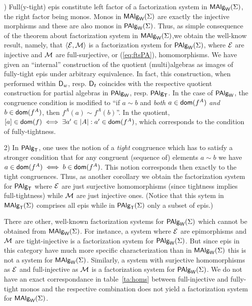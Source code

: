\documentclass[10pt]{article}
\begin{document}

) Full(y-tight) epis constitute left factor of a factorization system
in $\mbox{\rm\sf MAlg}_{\sf W}(\Sigma)$, the right factor being monos. Monos in $\mbox{\rm\sf MAlg}_{\sf W}(\Sigma)$ are exactly
the injective morphisms and these are also monos in $\mbox{\rm\sf PAlg}_{\sf W}(\Sigma)$. Thus, as
simple consequence of the theorem about factorization system in
$\mbox{\rm\sf MAlg}_{\sf W}(\Sigma)$,we obtain the well-know result, namely, that $\langle{\cal E},{\cal M}\rangle$
is a factorization system for $\mbox{\rm\sf PAlg}_{\sf W}(\Sigma)$, where ${\cal E}$ are injective and
${\cal M}$ are full-surjective, or (\ref{eq:ftsPA}), homomorphisms.  We
have given an ``internal'' construction of the quotient
(multi)algebras as images of fully-tight epis under arbitrary
equivalence. In fact, this construction, when performed within
$\mbox{\rm\sf D}_w$, resp.  $\mbox{\rm\sf D}_t$ coincides with the respective quotient
construction for partial algebras in $\mbox{\rm\sf PAlg}_{\sf W}$, resp. $\mbox{\rm\sf PAlg}_{\sf T}$.  In the
case of $\mbox{\rm\sf PAlg}_{\sf W}$, the congruence condition is modified to ``if $a \sim
b$ and {\em both} $a\in\mbox{\sf dom}(f^A)$ {\em and} $b\in\mbox{\sf dom}(f^A)$,
then $f^A(a)\sim f^A(b)$''. In the quotient, $[a]\in\mbox{\sf dom}(f) \iff
\exists a'\in|A|:a'\in\mbox{\sf dom}(f^A)$, which corresponds to the
condition of fully-tightness. 

\medskip

2) In $\mbox{\rm\sf PAlg}_{\sf T}$, one uses the notion of a {\em tight} congruence which
has to satisfy a stronger condition that for any congruent (sequence
of) elements $a\sim b$ we have $a\in \mbox{\sf dom}(f^A)\iff
b\in\mbox{\sf dom}(f^A)$. This notion corresponds then exactly to the tight
congruences.  Thus, as another corollary we obtain the factorization
system for $\mbox{\rm\sf PAlg}_{\sf T}$ where ${\cal E}$ are just surjective homomorphisms
(since tightness implies full-tightness) while ${\cal M}$ are just
injective ones. (Notice that this sytem in $\mbox{\rm\sf MAlg}_{\sf T}(\Sigma)$ comprises all epis
while in $\mbox{\rm\sf PAlg}_{\sf T}(\Sigma)$ only a subset of epis.) \vspace*{1ex}

There are other, well-known factorization systems for $\mbox{\rm\sf PAlg}_{\sf W}(\Sigma)$ which
cannot be obtained from $\mbox{\rm\sf MAlg}_{\sf W}(\Sigma)$. For instance, a system where ${\cal E}$
are epimorphisms and ${\cal M}$ are tight-injective is a factorization
system for $\mbox{\rm\sf PAlg}_{\sf W}(\Sigma)$. But since epis in this category have much more
specific characterization than in $\mbox{\rm\sf MAlg}_{\sf W}(\Sigma)$ this is not a system for
$\mbox{\rm\sf MAlg}_{\sf W}(\Sigma)$.  Similarly, a system with surjective homomorphisms as ${\cal E}$ and
full-injective as ${\cal M}$ is a factorization system for $\mbox{\rm\sf PAlg}_{\sf W}(\Sigma)$. We do
not have an exact correspondance in table~\ref{ta:homs} between
full-injective and fully-tight monos and the respective combination
does not yield a factorization system for $\mbox{\rm\sf MAlg}_{\sf W}(\Sigma)$.
\end{document}
